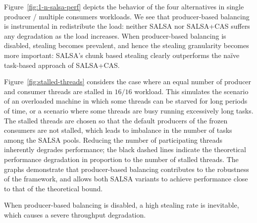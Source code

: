Figure~\ref{fig:1-n-salsa-perf} depicts the behavior of the four alternatives in single producer / multiple consumers workloads. 
We see that producer-based balancing is instrumental in redistribute the load: neither SALSA nor SALSA+CAS suffers any degradation as the load increases. 
When producer-based balancing is disabled, stealing becomes prevalent, and hence the stealing granularity becomes more important: 
SALSA's chunk based stealing clearly outperforms the na\"{i}ve task-based approach of SALSA+CAS. 

Figure~\ref{fig:stalled-threads} considers the case where an equal number of producer and consumer threads are stalled in $16/16$ workload. This simulates the scenario of an overloaded machine in which some threads can be starved for long periods of time, or a scenario where some threads are busy running excessively long tasks. 
The stalled threads are chosen so that the default producers of the frozen consumers are not stalled, which leads to imbalance in the number of tasks among the SALSA pools. 
Reducing the number of participating threads inherently degrades performance; the black dashed lines indicate the theoretical performance degradation in proportion to the number of stalled threads.
The graphs demonstrate that producer-based balancing contributes to the robustness of the framework, and allows both SALSA variants to achieve performance close to that of the theoretical bound.

When producer-based balancing is disabled, a high stealing rate is inevitable, which causes a severe throughput degradation.

%
%
%
%
